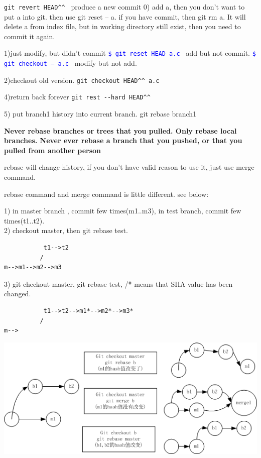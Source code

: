 \documentclass[a4paper,12pt,twoside]{book}
\newcommand{\linuxcommand}[1]{\texttt{\textcolor{blue}{\$ #1 \Pisymbol{psy}{191}}}}
\begin{document}
\verb=git revert HEAD^^ = produce a new commit
 0) add a, then you don't want to put a into git.  then use git reset
-- a. if you have commit, then git rm a. It will delete a from index file,
 but in working directory still exist, then you need to commit it again. \par

1)just modify, but didn't commit \linuxcommand{git reset HEAD a.c} add but not commit. \linuxcommand{git checkout -- a.c} modify but not add. \par

2)checkout old version. \verb=git checkout HEAD^^ a.c= \par

4)return back forever \verb=git rest --hard HEAD^^= \par

5) put branch1 history into current branch.
 git rebase branch1  \par


\textbf{Never rebase branches or trees that you pulled. Only rebase local branches.
Never ever rebase a branch that you pushed, or that you pulled from another person}
\par rebase will change history, if you don't have valid reason to use it, just use merge
command.

rebase command and merge command is little different. see below:

1) in master  branch , commit few times(m1..m3), in test branch, commit few times(t1..t2). \\
 2) checkout master, then git rebase  test. \\

\begin{verbatim}
           t1-->t2
          /
m-->m1-->m2-->m3
\end{verbatim}

3) git checkout master, git rebase test, /* means that SHA value has been changed.

\begin{verbatim}
           t1-->t2-->m1*-->m2*-->m3*
          /
m-->
\end{verbatim}





\includegraphics[scale=0.7]{pics/Git_rebase} \\
\end{document}
